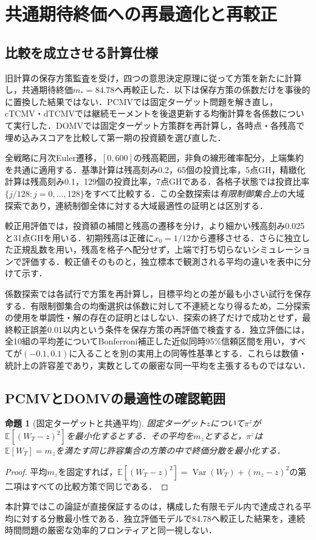 \documentclass[11pt,a4paper]{article}
\numberwithin{equation}{section}
\numberwithin{table}{section}
\numberwithin{figure}{section}
\theoremstyle{plain}
\newtheorem{proposition}{命題}
\theoremstyle{definition}
\newcommand{\E}{\mathbb{E}}
\DeclareMathOperator{\Var}{Var}
\begin{document}
\FloatBarrier
\section{共通期待終価への再最適化と再較正}
\label{sec:equalmean}
\subsection{比較を成立させる計算仕様}
旧計算の保存方策監査を受け，四つの意思決定原理に従って方策を新たに計算し，共通期待終価$m_*=84.78$へ再較正した．以下は保存方策の係数だけを事後的に置換した結果ではない．PCMVでは固定ターゲット問題を解き直し，cTCMV・dTCMVでは継続モーメントを後退更新する均衡計算を各係数について実行した．DOMVでは固定ターゲット方策群を再計算し，各時点・各残高で埋め込みスコアを比較して第一期の投資額を選び直した．

全戦略に月次Euler遷移，$[0,600]$の残高範囲，非負の線形確率配分，上端集約を共通に適用する．基準計算は残高刻み0.2，65個の投資比率，5点GH，精緻化計算は残高刻み0.1，129個の投資比率，7点GHである．各格子状態では投資比率$\{j/128:j=0,\ldots,128\}$をすべて比較する．この全数探索は\emph{有限制御集合上}の大域探索であり，連続制御全体に対する大域最適性の証明とは区別する．

較正用評価では，投資額の補間と残高の遷移を分け，より細かい残高刻み0.025と31点GHを用いる．初期残高は正確に$x_0=1/12$から遷移させる．さらに独立した正規乱数を用い，残高を格子へ配分せず，上端で打ち切らないシミュレーションで評価する．較正値そのものと，独立標本で観測される平均の違いを表中に分けて示す．

係数探索では各試行で方策を再計算し，目標平均との差が最も小さい試行を保存する．有限制御集合の均衡選択は係数に対して不連続となり得るため，二分探索の使用を単調性・解の存在の証明とはしない．探索の終了だけで成功とせず，最終較正誤差0.01以内という条件を保存方策の再評価で検査する．独立評価には，全10組の平均差についてBonferroni補正した近似同時95\%信頼区間を用い，すべてが$(-0.1,0.1)$に入ることを別の実用上の同等性基準とする．これらは数値・統計上の許容差であり，実数としての厳密な同一平均を主張するものではない．

\subsection{PCMVとDOMVの最適性の確認範囲}
\begin{proposition}[固定ターゲットと共通平均]
固定ターゲット$z$について$\pi^z$が$\E[(W_T-z)^2]$を最小化するとする．その平均を$m_z$とすると，$\pi^z$は$\E[W_T]=m_z$を満たす同じ許容集合の方策の中で終価分散を最小化する．
\end{proposition}
\begin{proof}
平均$m_z$を固定すれば，$\E[(W_T-z)^2]=\Var(W_T)+(m_z-z)^2$の第二項はすべての比較方策で同じである．
\end{proof}
本計算ではこの論証が直接保証するのは，構成した有限モデル内で達成される平均に対する分散最小性である．独立評価モデルで84.78へ較正した結果を，連続時間問題の厳密な効率的フロンティアと同一視しない．
\end{document}
